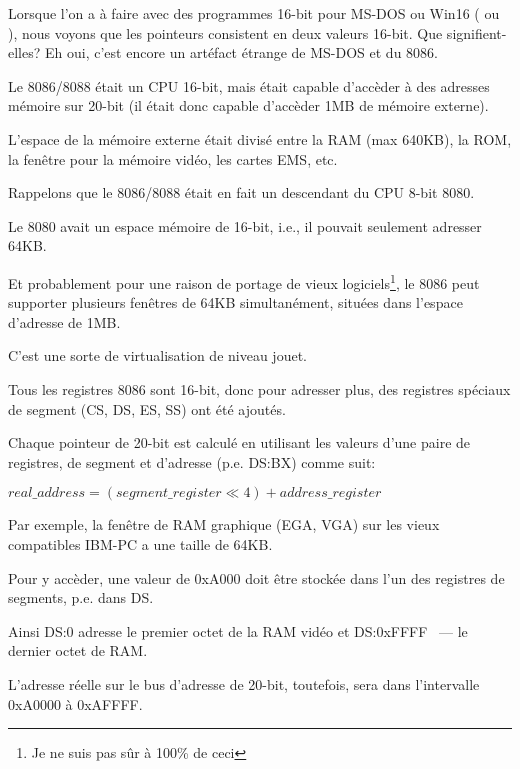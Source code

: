 \label{8086_memory_model}

Lorsque l'on a à faire avec des programmes 16-bit pour MS-DOS ou Win16
( ou ),
nous voyons que les pointeurs consistent en deux valeurs 16-bit.
Que signifient-elles? Eh oui, c'est encore un artéfact étrange de MS-DOS et du 8086.

Le 8086/8088 était un CPU 16-bit, mais était capable d'accèder à des adresses mémoire
sur 20-bit (il était donc capable d'accèder 1MB de mémoire externe).

L'espace de la mémoire externe était divisé entre la \ac{RAM} (max 640KB), la \ac{ROM},
la fenêtre pour la mémoire vidéo, les cartes EMS, etc.

Rappelons que le 8086/8088 était en fait un descendant du CPU 8-bit 8080.

Le 8080 avait un espace mémoire de 16-bit, i.e., il pouvait seulement adresser 64KB.

Et probablement pour une raison de portage de vieux logiciels\footnote{Je ne suis
pas sûr à 100\% de ceci}, le 8086 peut supporter plusieurs fenêtres de 64KB simultanément,
situées dans l'espace d'adresse de 1MB.

C'est une sorte de virtualisation de niveau jouet.

Tous les registres 8086 sont 16-bit, donc pour adresser plus, des registres spéciaux
de segment (CS, DS, ES, SS) ont été ajoutés.

Chaque pointeur de 20-bit est calculé en utilisant les valeurs d'une paire de registres,
de segment et d'adresse (p.e. DS:BX) comme suit:

\begin{center}
$real\_address = (segment\_register \ll 4) + address\_register$
\end{center}

Par exemple, la fenêtre de \ac{RAM} graphique (\ac{EGA}, \ac{VGA}) sur les vieux
compatibles IBM-PC a une taille de 64KB.

Pour y accèder, une valeur de 0xA000 doit être stockée dans l'un des registres de
segments, p.e. dans DS.

Ainsi DS:0 adresse le premier octet de la \ac{RAM} vidéo et DS:0xFFFF ~--- le dernier
octet de RAM.

L'adresse réelle sur le bus d'adresse de 20-bit, toutefois, sera dans l'intervalle
0xA0000 à 0xAFFFF.

